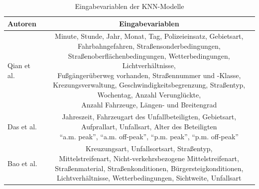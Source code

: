 \documentclass{scrartcl}
\begin{document}
\begin{table}[h!]
   \centering
   \caption{Eingabevariablen der KNN-Modelle}
   \begin{tabular}{lc} \toprule
      Autoren & Eingabevariablen \\ \midrule
      Qian et al. & \makecell[r]{Minute, Stunde, Jahr, Monat, Tag, Polizeieinsatz, Gebietsart, \\ Fahrbahngefahren, Straßensonderbedingungen, \\ Straßenoberflächenbedingungen, Wetterbedingungen, Lichtverhältnisse, \\ Fußgängerüberweg vorhanden, Straßennummer und -Klasse, \\ Krezungsverwaltung, Geschwindigkeitsbegrenzung, Straßentyp, \\ Wochentag, Anzahl Verunglückte, \\ Anzahl Fahrzeuge, Längen- und Breitengrad} \\ \midrule
      Das et al. & \makecell[r]{Jahreszeit, Fahrzeugart des Unfallbeteiligten, Gebietsart, \\ Aufprallart, Unfallsart, Alter des Beteiligten \\ \enquote{a.m. peak}, \enquote{a.m. off-peak}, \enquote{p.m. peak}, \enquote{p.m. off-peak}} \\ \midrule
      Bao et al. & \makecell[r]{Kreuzungsart, Unfallsortsart, Straßentyp, \\ Mittelstreifenart, Nicht-verkehrsbezogene Mittelstreifenart, \\ Straßenmaterial, Straßenkonditionen, Bürgersteigkonditionen, \\ Lichtverhältnisse, Wetterbedingungen, Sichtweite, Unfallsart} \\ \bottomrule
   \end{tabular}
   \label{tab2}
\end{table}
\end{document}
